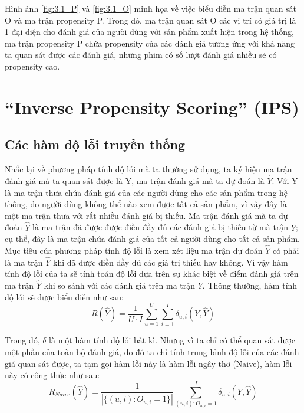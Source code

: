 Hình ảnh \ref{fig:3.1_P} và \ref{fig:3.1_O} minh họa về việc biểu diễn ma trận quan sát O và ma trận propensity P. Trong đó, ma trận quan sát O các vị trí có giá trị là 1 đại diện cho đánh giá của người dùng với sản phẩm xuất hiện trong hệ thống, ma trận propensity P chứa propensity của các đánh giá tương ứng với khả năng ta quan sát được các đánh giá, những phim có số lượt đánh giá nhiều sẽ có propensity cao.

\section{``Inverse Propensity Scoring'' (IPS)}
\subsection{Các hàm độ lỗi truyền thống}
Nhắc lại về phương pháp tính độ lỗi mà ta thường sử dụng, ta ký hiệu ma trận đánh giá mà ta quan sát được là Y, ma trận đánh giá mà ta dự đoán là $\hat{Y}$. Với Y là ma trận thưa chứa đánh giá của các người dùng cho các sản phẩm trong hệ thống, do người dùng không thể nào xem được tất cả sản phẩm, vì vậy đây là một ma trận thưa với rất nhiều đánh giá bị thiếu. Ma trận đánh giá mà ta dự đoán $\hat{Y}$ là ma trận đã được được điền đầy đủ các đánh giá bị thiếu từ mà trận $Y$; cụ thể, đây là ma trận chứa đánh giá của tất cả người dùng cho tất cả sản phẩm. Mục tiêu của phương pháp tính độ lỗi là xem xét liệu ma trận dự đoán $\hat{Y}$ có phải là ma trận $\hat{Y}$ khi đã được điền đầy đủ các giá trị thiếu hay không. Vì vậy hàm tính độ lỗi của ta sẽ tính toán độ lỗi dựa trên sự khác biệt về điểm đánh giá trên ma trận $\hat{Y}$ khi so sánh với các đánh giá trên ma trận $Y$. Thông thường, hàm tính độ lỗi sẽ được biểu diễn như sau:
\begin{equation}
\label{eq:tradition}
R(\hat{Y}) = \frac{1}{U\cdot I}  \sum_{u=1}^{U} \sum_{i=1}^{I} \delta_{u,i}(Y,\hat{Y})
\end{equation}

Trong đó, $\delta$ là một hàm tính độ lỗi bất kì.
Nhưng vì ta chỉ có thể quan sát được một phần của toàn bộ đánh giá, do đó ta chỉ tính trung bình độ lỗi của các đánh giá quan sát được, ta tạm gọi hàm lỗi này là hàm lỗi ngây thơ (Naive), hàm lỗi này có công thức như sau:
\begin{equation}
\label{eq:naive}
R_{Naive}(\hat{Y}) = \frac{1}{|\{(u,i):O_{u,i} = 1\}|} \sum_{(u,i):O_{u,i}=1}^{I} \delta_{u,i}(Y,\hat{Y}) 
\end{equation}


